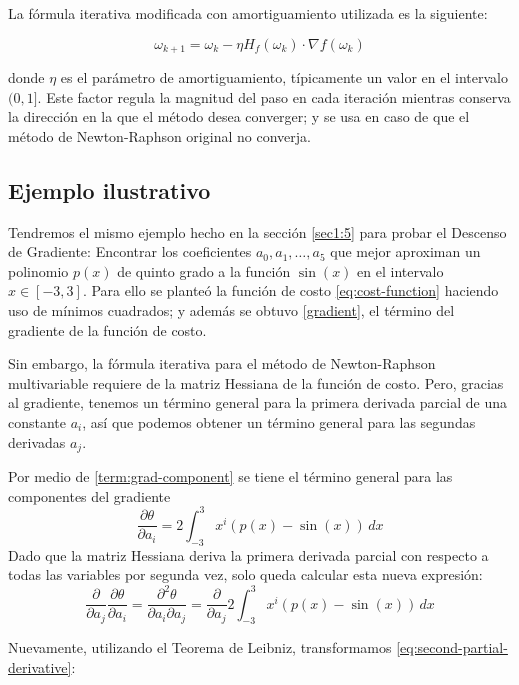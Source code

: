 \documentclass[conference]{IEEEtran}
\begin{document}
La fórmula iterativa modificada con amortiguamiento utilizada es la siguiente:

\begin{equation}
    \omega_{k+1}=\omega_{k}-\eta H_{f}(\omega_{k})\cdot\nabla f(\omega_{k})
    \label{eq:damped-newton-raphson}
\end{equation}

donde $\eta$ es el parámetro de amortiguamiento, típicamente un valor en el intervalo $(0,1]$. Este factor regula la magnitud del paso en cada iteración mientras conserva la dirección en la que el método desea converger; y se usa en caso de que el método de Newton-Raphson original no converja.

\subsection{Ejemplo ilustrativo}\label{sec:example-newton-raphson}
Tendremos el mismo ejemplo hecho en la sección \ref{sec1:5} para probar el Descenso de Gradiente: Encontrar los coeficientes $a_0, a_1, \dots, a_5$ que mejor aproximan un polinomio $p(x)$ de quinto grado a la función $\sin(x)$ en el intervalo $x\in[-3,3]$. Para ello se planteó la función de costo \eqref{eq:cost-function} haciendo uso de mínimos cuadrados; y además se obtuvo \eqref{gradient}, el término del gradiente de la función de costo.

Sin embargo, la fórmula iterativa para el método de Newton-Raphson multivariable requiere de la matriz Hessiana de la función de costo. Pero, gracias al gradiente, tenemos un término general para la primera derivada parcial de una constante $a_i$, así que podemos obtener un término general para las segundas derivadas $a_j$.

Por medio de \eqref{term:grad-component} se tiene el término general para las componentes del gradiente
$$
\frac{ \partial \theta }{ \partial a_{i} } =2\int_{-3}^{3} x^{i}(p(x)-\sin(x))\, dx
$$
Dado que la matriz Hessiana deriva la primera derivada parcial con respecto a todas las variables por segunda vez, solo queda calcular esta nueva expresión:
\begin{equation}
    \frac{ \partial  }{ \partial a_{j} } \frac{ \partial \theta }{ \partial a_{i} } =\frac{\partial^{2} \theta}{\partial a_{i} \partial a_{j}}=\frac{ \partial }{ \partial a_{j} } 2\int_{-3}^{3} x^{i}(p(x)-\sin(x))\, dx
    \label{eq:second-partial-derivative}
\end{equation}

Nuevamente, utilizando el Teorema de Leibniz, transformamos \eqref{eq:second-partial-derivative}:
\end{document}
